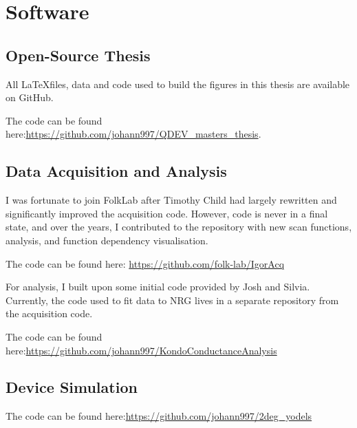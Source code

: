 \chapter{Software}\label{cha:appendix2}


\section{Open-Source Thesis}
All \LaTeX files, data and code used to build the figures in this thesis are available on GitHub.

The code can be found here:\newline \url{https://github.com/johann997/QDEV_masters_thesis}.

\section{Data Acquisition and Analysis}

I was fortunate to join FolkLab after Timothy Child had largely rewritten and significantly improved the acquisition code. However, code is never in a final state, and over the years, I contributed to the repository with new scan functions, analysis, and function dependency visualisation.

The code can be found here:\newline 
\url{https://github.com/folk-lab/IgorAcq}



For analysis, I built upon some initial code provided by Josh and Silvia. Currently, the code used to fit data to NRG lives in a separate repository from the acquisition code. 

The code can be found here:\newline \url{https://github.com/johann997/KondoConductanceAnalysis}

\section{Device Simulation}

The code can be found here:\newline \url{https://github.com/johann997/2deg_yodels}


